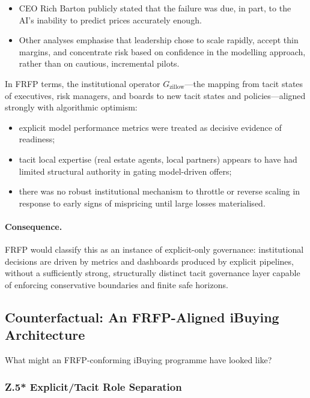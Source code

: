 \begin{itemize}
  \item CEO Rich Barton publicly stated that the failure was due, in part, to
        the AI’s inability to predict prices accurately enough.
  \item Other analyses emphasise that leadership chose to scale rapidly,
        accept thin margins, and concentrate risk based on confidence in the
        modelling approach, rather than on cautious, incremental pilots.
\end{itemize}

In FRFP terms, the institutional operator \(G_{\mathrm{zillow}}\)---the
mapping from tacit states of executives, risk managers, and boards to new
tacit states and policies---aligned strongly with algorithmic optimism:

\begin{itemize}
  \item explicit model performance metrics were treated as decisive evidence
        of readiness;
  \item tacit local expertise (real estate agents, local partners) appears to
        have had limited structural authority in gating model-driven offers;
  \item there was no robust institutional mechanism to throttle or reverse
        scaling in response to early signs of mispricing until large losses
        materialised.
\end{itemize}

\paragraph{Consequence.}
FRFP would classify this as an instance of explicit-only governance:
institutional decisions are driven by metrics and dashboards produced by
explicit pipelines, without a sufficiently strong, structurally distinct
tacit governance layer capable of enforcing conservative boundaries and
finite safe horizons.

\subsection{Counterfactual: An FRFP-Aligned iBuying Architecture}

What might an FRFP-conforming iBuying programme have looked like?

\subsubsection*{Z.5* Explicit/Tacit Role Separation}


